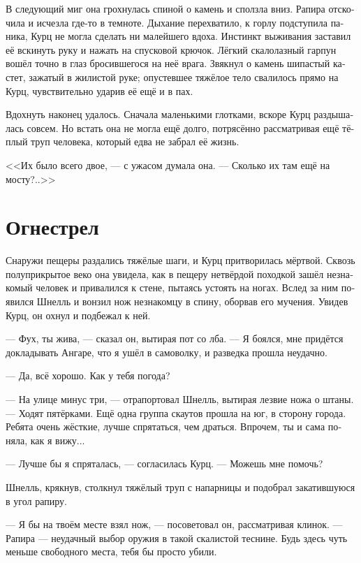 \documentclass[a4paper,12pt,fleqn]{book}\usepackage{polyglossia}\setdefaultlanguage[babelshorthands=true]{russian}\setotherlanguage{english}\defaultfontfeatures{Ligatures=TeX,Mapping=tex-text}\usepackage{xcolor}\newcommand{\ml}[3]{#2}
\begin{document}
В следующий миг она грохнулась спиной о камень и сползла вниз.
Рапира отскочила и исчезла где-то в темноте.
Дыхание перехватило, к горлу подступила паника, Курц не могла сделать ни малейшего вдоха.
Инстинкт выживания заставил её вскинуть руку и нажать на спусковой крючок.
Лёгкий скалолазный гарпун вошёл точно в глаз бросившегося на неё врага.
Звякнул о камень шипастый кастет, зажатый в жилистой руке;
опустевшее тяжёлое тело свалилось прямо на Курц, чувствительно ударив её ещё и в пах.

Вдохнуть наконец удалось.
Сначала маленькими глотками, вскоре Курц раздышалась совсем.
Но встать она не могла ещё долго, потрясённо рассматривая ещё тёплый труп человека, который едва не забрал её жизнь.

<<Их было всего двое, --- с ужасом думала она.
--- Сколько их там ещё на мосту?..>>

\section{Огнестрел}

Снаружи пещеры раздались тяжёлые шаги, и Курц притворилась мёртвой.
Сквозь полуприкрытое веко она увидела, как в пещеру нетвёрдой походкой зашёл незнакомый человек и привалился к стене, пытаясь устоять на ногах.
Вслед за ним появился Шнелль и вонзил нож незнакомцу в спину, оборвав его мучения.
Увидев Курц, он охнул и подбежал к ней.

--- Фух, ты жива, --- сказал он, вытирая пот со лба.
--- Я боялся, мне придётся докладывать Ангаре, что я ушёл в самоволку, и разведка прошла неудачно.

--- Да, всё хорошо.
\ml{$0$}
{Как у тебя погода?}
{What's the weather like out there?''}

\ml{$0$}
{--- На улице минус три, --- отрапортовал Шнелль, вытирая лезвие ножа о штаны.}
{``Minus three degrees Kampfbereit,'' Schnell reported, wiping knife blade with his trousers.}
--- Ходят пятёрками.
Ещё одна группа скаутов прошла на юг, в сторону города.
\ml{$0$}
{Ребята очень жёсткие, лучше спрятаться, чем драться.}
{Tough guys, it's better hide than fight.}
\ml{$0$}
{Впрочем, ты и сама поняла, как я вижу...}
{However, you already got it, I see ....''}

--- Лучше бы я спряталась, --- согласилась Курц.
--- Можешь мне помочь?

Шнелль, крякнув, столкнул тяжёлый труп с напарницы и подобрал закатившуюся в угол рапиру.

--- Я бы на твоём месте взял нож, --- посоветовал он, рассматривая клинок.
--- Рапира --- неудачный выбор оружия в такой скалистой теснине.
Будь здесь чуть меньше свободного места, тебя бы просто убили.
\end{document}
